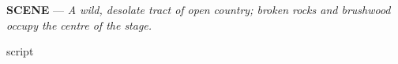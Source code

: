 \documentclass[12pt,a4paper]{article}
\renewcommand{\sc}[1]{\textsc{\MakeUppercase{#1}}}
\begin{document}

\DramPer

\newpage

\noindent
\textbf{\sc{SCENE}} — \textit{A wild, desolate tract of open country; broken rocks and brushwood occupy the centre of the stage.}
\vspace{.5em}

\begin{drama}
\sloppy
script

\end{drama}
\end{document}
